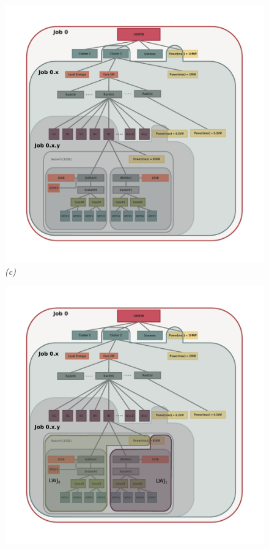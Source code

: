 \documentclass{article}
\begin{document}
\begin{figure}
\begin{minipage}{0.5\linewidth}
  \begin{center}
  \includegraphics[scale=0.45]{job-hierarchy-job0-x-y}
  {\em (c)}
  \end{center}
\end{minipage}
\begin{minipage}{0.5\linewidth}
  \begin{center}
  \includegraphics[scale=0.45]{job-hierarchy-lwj}

\end{center}
\end{minipage}
\end{figure}
\end{document}
